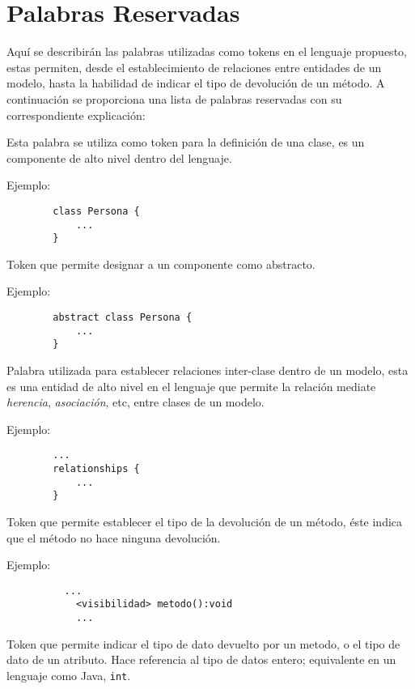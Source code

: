 \section{Palabras Reservadas}
\label{sec:palabrasreservadas}

Aquí se describirán las palabras utilizadas como tokens en el lenguaje
propuesto, estas permiten, desde el establecimiento de relaciones
entre entidades de un modelo, hasta la habilidad de indicar el tipo de devolución
de un método. A continuación se proporciona una lista de palabras reservadas
con su correspondiente explicación:

\begin{description}[align=right,labelwidth=2.5cm]

\item [class] Esta palabra se utiliza como token para la definición de una clase,
	es un componente de alto nivel dentro del lenguaje.

	Ejemplo:
		\begin{lstlisting}
		class Persona {
			...
		}
		\end{lstlisting}

\item [abstract] Token que permite designar a un componente como abstracto.

	Ejemplo:
		\begin{lstlisting}
		abstract class Persona {
			...
		}
		\end{lstlisting}

\item [relationships] Palabra utilizada para establecer relaciones inter-clase
	dentro de un modelo, esta es una entidad de alto nivel en el lenguaje que
	permite la relación mediate \textit{herencia}, \textit{asociación}, etc,
	entre clases de un modelo.

	Ejemplo:
		\begin{lstlisting}
		...
		relationships {
			...
		}
		\end{lstlisting}


\item [void] Token que permite establecer el tipo de la devolución de un
	método, éste indica que el método no hace ninguna	devolución.

	Ejemplo:
		\begin{lstlisting}
		  ...
			<visibilidad> metodo():void
			...
		\end{lstlisting}

\item [integer] Token que permite indicar el tipo de dato devuelto por un metodo, o
	el tipo de dato de un atributo. Hace referencia al tipo de
	datos entero; equivalente en un lenguaje como Java, \texttt{int}.


\end{description}
